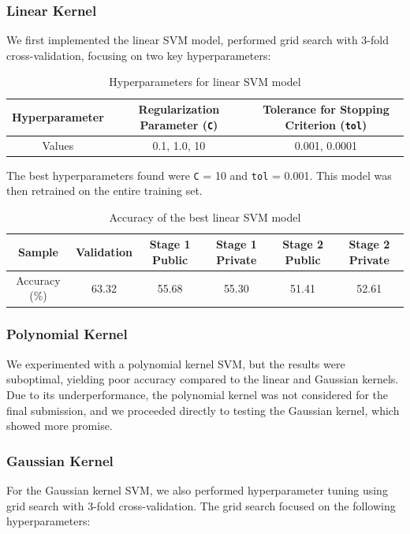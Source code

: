 \documentclass[11pt,a4paper]{article}
\begin{document}
\subsubsection{Linear Kernel}
We first implemented the linear SVM model, performed grid search with 3-fold cross-validation, focusing on two key hyperparameters:

\begin{table}[H]
  \centering
  \begin{tabular}{|c|c|c|}
  \hline
  Hyperparameter & Regularization Parameter (\texttt{C}) & Tolerance for Stopping Criterion (\texttt{tol}) \\ \hline
  Values & 0.1, 1.0, 10 & 0.001, 0.0001 \\ \hline
  \end{tabular}
  \caption{Hyperparameters for linear SVM model}
\end{table}

The best hyperparameters found were \texttt{C} = 10 and \texttt{tol} = 0.001. This model was then retrained on the entire training set.

\begin{table}[H]
  \centering
  \begin{tabular}{|c|c|c|c|c|c|}
  \hline
  Sample & Validation & Stage 1 Public & Stage 1 Private & Stage 2 Public & Stage 2 Private \\ \hline
  Accuracy (\%) & 63.32 & 55.68 & 55.30 & 51.41 & 52.61 \\ \hline
  \end{tabular}
  \caption{Accuracy of the best linear SVM model}
\end{table}


\subsubsection{Polynomial Kernel}
We experimented with a polynomial kernel SVM, but the results were suboptimal, yielding poor accuracy compared to the linear and Gaussian kernels. Due to its underperformance, the polynomial kernel was not considered for the final submission, and we proceeded directly to testing the Gaussian kernel, which showed more promise.


\subsubsection{Gaussian Kernel}
For the Gaussian kernel SVM, we also performed hyperparameter tuning using grid search with 3-fold cross-validation. The grid search focused on the following hyperparameters:
\end{document}
